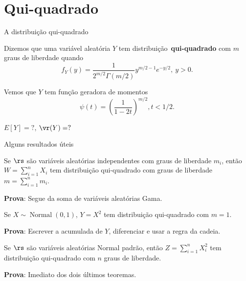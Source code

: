 \section{Qui-quadrado}

\begin{frame}{A distribuição qui-quadrado}
 \begin{defn}
 Dizemos que uma variável aleatória $Y$ tem distribuição~\textbf{qui-quadrado} com $m$ graus de liberdade quando
 \begin{equation}
 \label{eq:chi_square_density}
 f_Y(y) = \frac{1}{2^{m/2}\Gamma(m/2)} y^{m/2 - 1}e^{-y/2}, \: y >0.
 \end{equation} 
 
 Vemos que $Y$ tem função geradora de momentos
\[\psi(t) = \left( \frac{1}{1-2t}\right)^{m/2}, t < 1/2 .\]
 \end{defn}
$E[Y] = ?$, $\vr(Y) =?$  
\end{frame}

\begin{frame}{Alguns resultados úteis}

\begin{theo}
\label{thm:sum_chisquare}
Se $\rs$ são variáveis aleatórias independentes com graus de liberdade $m_i$, então $W = \sum_{i=1}^n X_i$ tem distribuição qui-quadrado com graus de liberdade $m =  \sum_{i=1}^n m_i$.
\end{theo}
\textbf{Prova}: Segue da soma de variáveis aleatórias Gama.

\begin{theo}
\label{thm:square_of_normal}
Se $X \sim\operatorname{Normal}(0, 1)$, $Y = X^2$ tem distribuição qui-quadrado com $m=1$. 
\end{theo}
\textbf{Prova}: Escrever a acumulada de $Y$, diferenciar e usar a regra da cadeia.

\begin{obs}
\label{rmk:sum_squares_standard_normal}
 Se $\rs$ são variáveis aleatórias Normal padrão, então $Z = \sum_{i=1}^n X_i^2$ tem distribuição qui-quadrado com $n$ graus de liberdade.
\end{obs}
\textbf{Prova}: Imediato dos dois últimos teoremas.

\end{frame}

